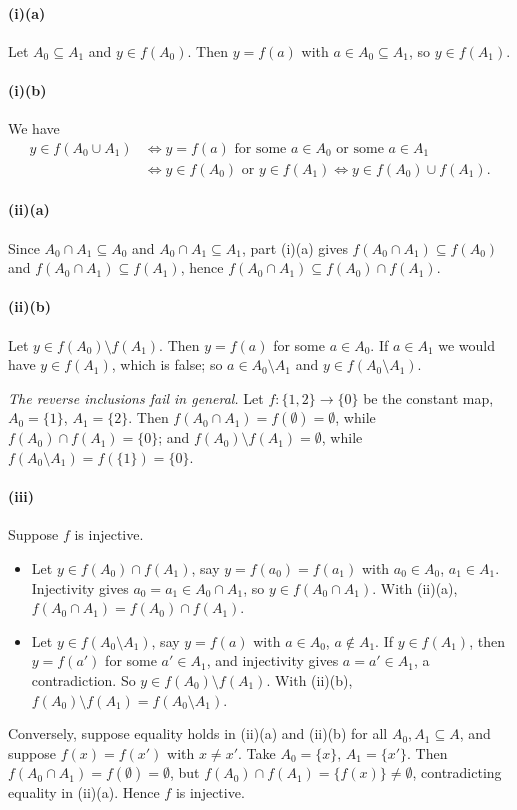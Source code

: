 
\paragraph{(i)(a)} Let $A_0\subseteq A_1$ and $y\in f(A_0)$. Then $y=f(a)$ with
$a\in A_0\subseteq A_1$, so $y\in f(A_1)$.

\paragraph{(i)(b)} We have
\begin{align*}
y\in f(A_0\cup A_1)
&\iff y=f(a) \text{ for some } a\in A_0 \text{ or some } a\in A_1\\
&\iff y\in f(A_0) \text{ or } y\in f(A_1)
\iff y\in f(A_0)\cup f(A_1).
\end{align*}

\paragraph{(ii)(a)} Since $A_0\cap A_1\subseteq A_0$ and $A_0\cap A_1\subseteq A_1$, part (i)(a)
gives $f(A_0\cap A_1)\subseteq f(A_0)$ and $f(A_0\cap A_1)\subseteq f(A_1)$, hence
$f(A_0\cap A_1)\subseteq f(A_0)\cap f(A_1)$.

\paragraph{(ii)(b)} Let $y\in f(A_0)\setminus f(A_1)$. Then $y=f(a)$ for some $a\in A_0$. If
$a\in A_1$ we would have $y\in f(A_1)$, which is false; so $a\in A_0\setminus A_1$ and
$y\in f(A_0\setminus A_1)$.

\emph{The reverse inclusions fail in general.} Let $f\colon\{1,2\}\to\{0\}$ be the constant
map, $A_0=\{1\}$, $A_1=\{2\}$. Then $f(A_0\cap A_1)=f(\emptyset)=\emptyset$, while
$f(A_0)\cap f(A_1)=\{0\}$; and $f(A_0)\setminus f(A_1)=\emptyset$, while
$f(A_0\setminus A_1)=f(\{1\})=\{0\}$.

\paragraph{(iii)} Suppose $f$ is injective.
\begin{itemize}
  \item Let $y\in f(A_0)\cap f(A_1)$, say $y=f(a_0)=f(a_1)$ with $a_0\in A_0$, $a_1\in A_1$.
        Injectivity gives $a_0=a_1\in A_0\cap A_1$, so $y\in f(A_0\cap A_1)$. With (ii)(a),
        $f(A_0\cap A_1)=f(A_0)\cap f(A_1)$.
  \item Let $y\in f(A_0\setminus A_1)$, say $y=f(a)$ with $a\in A_0$, $a\notin A_1$. If
        $y\in f(A_1)$, then $y=f(a')$ for some $a'\in A_1$, and injectivity gives
        $a=a'\in A_1$, a contradiction. So $y\in f(A_0)\setminus f(A_1)$. With (ii)(b),
        $f(A_0)\setminus f(A_1)=f(A_0\setminus A_1)$.
\end{itemize}

Conversely, suppose equality holds in (ii)(a) and (ii)(b) for all $A_0,A_1\subseteq A$, and
suppose $f(x)=f(x')$ with $x\neq x'$. Take $A_0=\{x\}$, $A_1=\{x'\}$. Then
$f(A_0\cap A_1)=f(\emptyset)=\emptyset$, but $f(A_0)\cap f(A_1)=\{f(x)\}\neq\emptyset$,
contradicting equality in (ii)(a). Hence $f$ is injective.
